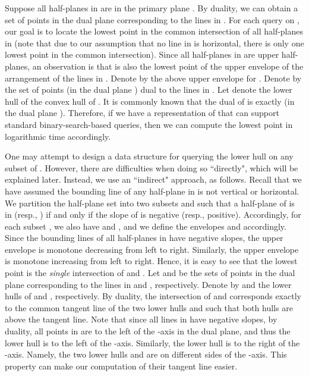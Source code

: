 \documentclass{llncs}
\begin{document}
Suppose all half-planes in  are in the primary plane .
By duality, we can obtain a
set  of points in the dual plane  corresponding to the
lines in . For each query  on , our goal is to locate
the lowest point  in the common intersection of all half-planes
in  (note that due to our assumption that no line in  is
horizontal, there is only one lowest point in the common intersection).
Since all half-planes in  are upper half-planes,
an observation is that  is also the lowest point of
the upper envelope of the arrangement of the lines in .
Denote by  the above upper envelope for .
Denote by  the set of points (in the dual plane ) dual to the
lines  in . Let  denote
the lower hull of the convex hull of . It is commonly known
\cite{ref:deBergCo08} that the dual of  is exactly 
(in the dual plane ).
Therefore, if we have a representation of 
that can support standard binary-search-based queries, then we can compute
the lowest point  in logarithmic time accordingly.

One may attempt to design a data structure for querying
the lower hull on any subset  of . However,
there are difficulties when doing so ``directly", which will be explained later.
Instead, we use an ``indirect" approach, as follows.
Recall that we have assumed the bounding line of any half-plane in
 is not vertical or horizontal.  We partition the half-plane set  into
two subsets  and  such that a half-plane  of  is in  (resp.,
) if and only if the slope of 
is negative (resp., positive). Accordingly, for each
subset , we also have  and ,
and we define the envelopes  and  accordingly. Since the
bounding lines of all half-planes in  have negative slopes,
the upper envelope  is monotone decreasing from left to
right. Similarly,  the upper envelope  is monotone
increasing from left to right. Hence, it is easy to see that the
lowest point  is the {\em single} intersection of  and .
Let  and  be the sets of points in the dual plane
corresponding to the lines in  and , respectively.
Denote by  and  the lower hulls of
 and , respectively. By duality, the
intersection of  and  corresponds exactly to the
common tangent line of the two lower hulls  and
 such that both hulls are above the tangent line. Note
that since all lines in  have negative slopes, by
duality, all points in  are to the left of the -axis
in the dual plane, and thus the lower hull  is to the
left of the -axis. Similarly, the lower hull  is to
the right of the -axis. Namely, the two lower hulls 
and  are on different sides of the -axis. This
property can make our computation of their tangent line easier.
\end{document}

